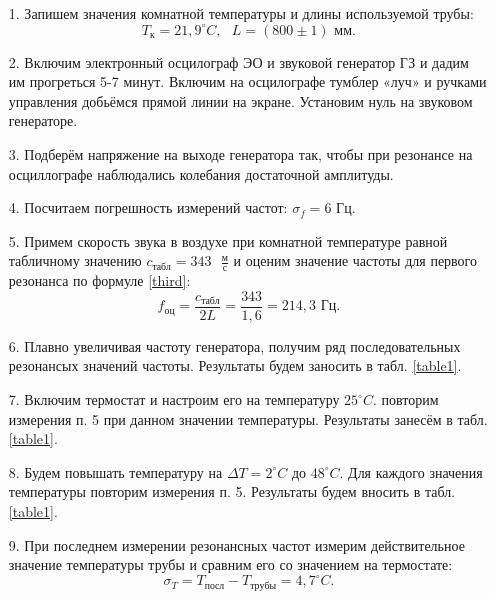 \documentclass[a4paper, 12pt]{article}
\begin{document}
    \begin{enumerate}
    
        \item[1.] Запишем значения комнатной температуры и длины используемой трубы:
        \begin{equation}
            T_{к} = 21,9^{\circ}  C, \text{ } L = (800\pm1) \text{ мм}.
        \end{equation}
        
        \item[2.] Включим электронный осцилограф ЭО и звуковой генератор ГЗ и дадим им прогреться 5-7 минут. Включим на осцилографе тумблер «луч» и ручками управления добьёмся прямой линии на экране. Установим нуль на звуковом генераторе.
        
        \item[3.] Подберём напряжение на выходе генератора так, чтобы при резонансе на осциллографе наблюдались колебания достаточной амплитуды.
        
        \item[4.] Посчитаем погрешность измерений частот: $\sigma_f = 6 \text{ Гц}$.
        
        \item[5.] Примем скорость звука в воздухе при комнатной температуре равной табличному значению $ c_{табл} = 343 \text{ }\frac{\text{м}}{\text{с}} $ и оценим значение частоты для первого резонанса по формуле \eqref{third}:
        \begin{equation}
            f_{оц} = \frac{c_{табл}}{2L} = \frac{343}{1,6} = 214,3 \text{ Гц}.
        \end{equation}
        
        \item[6.] Плавно увеличивая частоту генератора, получим ряд последовательных резонансых значений частоты. Результаты будем заносить в табл. \ref{table1}.
        
        \item[7.] Включим термостат и настроим его на температуру $25^{\circ}C$. повторим измерения п. 5 при данном значении температуры. Результаты занесём в табл. \ref{table1}.
        
        \item[8.] Будем повышать температуру на $\Delta T = 2^{\circ}C$ до $48^{\circ}C$. Для каждого значения температуры повторим измерения п. 5. Результаты будем вносить в табл. \ref{table1}.
        
        \item[9.] При последнем измерении резонансных частот измерим действительное значение температуры трубы и сравним его со значением на термостате:
        \begin{equation}
            \sigma_{T} = T_{посл} - T_{трубы} = 4,7^{\circ}C.
        \end{equation}
         
    \end{enumerate}
    
\end{document}
